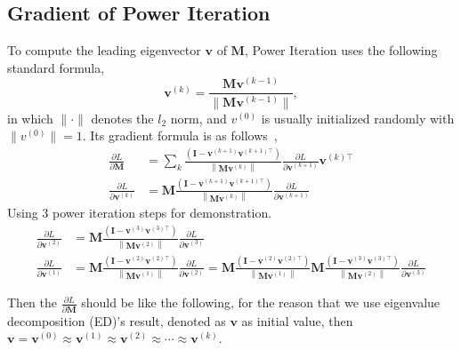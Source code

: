\documentclass{article}
\newcommand{\bM}{\mathbf{M}}
\newcommand{\bv}{\mathbf{v}}
\newcommand{\bI}{\mathbf{I}}
\begin{document}
	\subsection{Gradient of Power Iteration}
	\label{sec: pi}
	To compute the leading eigenvector $\bv$ of $\bM$, Power Iteration uses the following standard formula,
	\begin{equation}
	\bv^{(k)} = \frac{\bM\bv^{(k-1)}}{\| \bM\bv^{(k-1)} \|},
	\end{equation}
	in which $\| {\cdot} \|$ denotes the $l_2$ norm, and $v^{(0)}$ is usually initialized randomly with  $\|v^{(0)}\|{=}1$.
    Its gradient formula is as follows~\cite{ye2017dynamic},
	\begin{equation}
	\begin{aligned} 
	\frac{\partial L}{\partial \bM} &=\sum_{k} \frac{\left(\bI-\bv^{(k+1)} \bv^{(k+1)\top}\right)}{\left\|\bM \bv^{(k)}\right\|} \frac{\partial L}{\partial \bv^{(k+1)}} \bv^{(k)\top} \\
	\frac{\partial L}{\partial \bv^{(k)}} &=\bM \frac{\left(\bI-\bv^{(k+1)} \bv^{(k+1)\top}\right)}{\left\|\bM \bv^{(k)}\right\|} \frac{\partial L}{\partial \bv^{(k+1)}} 
	\end{aligned}
	\end{equation}
	Using 3 power iteration steps for demonstration.
	\begin{equation}
	\begin{aligned} 
	\frac{\partial L}{\partial \bv^{(2)}} &=\bM \frac{\left(\bI-\bv^{(3)} \bv^{(3)\top}\right)}{\left\|\bM \bv^{(2)}\right\|} \frac{\partial L}{\partial \bv^{(3)}}\\
	\frac{\partial L}{\partial \bv^{(1)}} &=\bM \frac{\left(\bI-\bv^{(2)} \bv^{(2)\top}\right)}{\left\|\bM \bv^{(1)}\right\|} \frac{\partial L}{\partial \bv^{(2)}}
	=\bM \frac{\left(\bI-\bv^{(2)} \bv^{(2)\top}\right)}{\left\|\bM \bv^{(1)}\right\|} 
	\bM \frac{\left(\bI-\bv^{(3)} \bv^{(3)\top}\right)}{\left\|\bM \bv^{(2)}\right\|} \frac{\partial L}{\partial \bv^{(3)}}
	\end{aligned}
	\end{equation}
	
	Then the $\frac{\partial L}{\partial \bM}$ should be like the following, for the reason that we use eigenvalue decomposition (ED)'s result, denoted as $\bv$ as initial value, then $\bv {=} \bv^{(0)} {\approx}\bv^{(1)} {\approx} \bv^{(2)}{\approx} \cdots {\approx}\bv^{(k)}$. 
	
\end{document}
